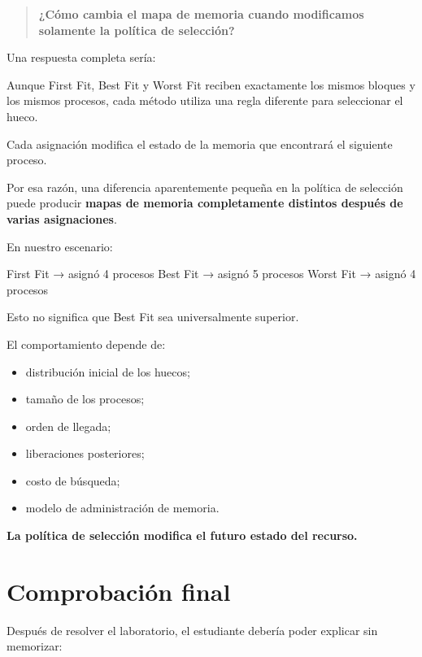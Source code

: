 \documentclass[
  spanish,
  letterpaper,
]{scrbook}
\newenvironment{Shaded}{\begin{snugshade}}{\end{snugshade}}
\newcommand{\NormalTok}[1]{\textcolor[rgb]{0.00,0.23,0.31}{#1}}
\providecommand{\tightlist}{%
  \setlength{\itemsep}{0pt}\setlength{\parskip}{0pt}}
\begin{document}
\begin{quote}
\textbf{¿Cómo cambia el mapa de memoria cuando modificamos solamente la
política de selección?}
\end{quote}

Una respuesta completa sería:

Aunque First Fit, Best Fit y Worst Fit reciben exactamente los mismos
bloques y los mismos procesos, cada método utiliza una regla diferente
para seleccionar el hueco.

Cada asignación modifica el estado de la memoria que encontrará el
siguiente proceso.

Por esa razón, una diferencia aparentemente pequeña en la política de
selección puede producir \textbf{mapas de memoria completamente
distintos después de varias asignaciones}.

En nuestro escenario:

\begin{Shaded}
\begin{Highlighting}[]
\NormalTok{First Fit → asignó 4 procesos}
\NormalTok{Best Fit  → asignó 5 procesos}
\NormalTok{Worst Fit → asignó 4 procesos}
\end{Highlighting}
\end{Shaded}

Esto no significa que Best Fit sea universalmente superior.

El comportamiento depende de:

\begin{itemize}
\tightlist
\item
  distribución inicial de los huecos;
\item
  tamaño de los procesos;
\item
  orden de llegada;
\item
  liberaciones posteriores;
\item
  costo de búsqueda;
\item
  modelo de administración de memoria.
\end{itemize}

\textbf{La política de selección modifica el futuro estado del recurso.}


\chapter{Comprobación final}\label{comprobaciuxf3n-final}

Después de resolver el laboratorio, el estudiante debería poder explicar
sin memorizar:
\end{document}
